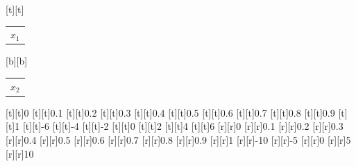 %    
%
%
\begin{psfrags}%
\psfragscanon%
%
[t][t]{\begin{tabular}{c}$x_1$\end{tabular}}%
[b][b]{\begin{tabular}{c}$x_2$\end{tabular}}%
%
[t][t]{0}%
[t][t]{0.1}%
[t][t]{0.2}%
[t][t]{0.3}%
[t][t]{0.4}%
[t][t]{0.5}%
[t][t]{0.6}%
[t][t]{0.7}%
[t][t]{0.8}%
[t][t]{0.9}%
[t][t]{1}%
[t][t]{-6}%
[t][t]{-4}%
[t][t]{-2}%
[t][t]{0}%
[t][t]{2}%
[t][t]{4}%
[t][t]{6}%
%
[r][r]{0}%
[r][r]{0.1}%
[r][r]{0.2}%
[r][r]{0.3}%
[r][r]{0.4}%
[r][r]{0.5}%
[r][r]{0.6}%
[r][r]{0.7}%
[r][r]{0.8}%
[r][r]{0.9}%
[r][r]{1}%
[r][r]{-10}%
[r][r]{-5}%
[r][r]{0}%
[r][r]{5}%
[r][r]{10}%
%
%
\end{psfrags}%
%
